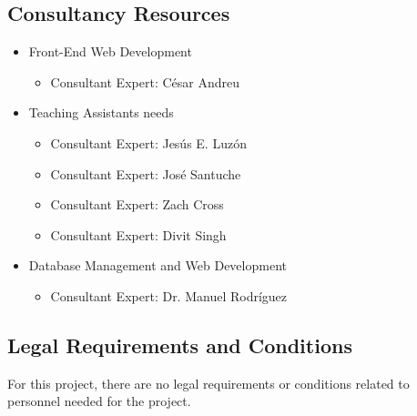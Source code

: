 \subsection{Consultancy Resources}
\begin{itemize}
\item Front-End Web Development
\begin{itemize}
\item Consultant Expert: César Andreu
\end{itemize}
\item Teaching Assistants needs
\begin{itemize}
\item Consultant Expert: Jesús E. Luzón
\item Consultant Expert: José Santuche
\item Consultant Expert: Zach Cross
\item Consultant Expert: Divit Singh
\end{itemize}
\item Database Management and Web Development
\begin{itemize}
\item Consultant Expert: Dr. Manuel Rodríguez
\end{itemize}
\end{itemize}

\subsection{Legal Requirements and Conditions}

For this project, there are no legal requirements or conditions related to
personnel needed for the project.
